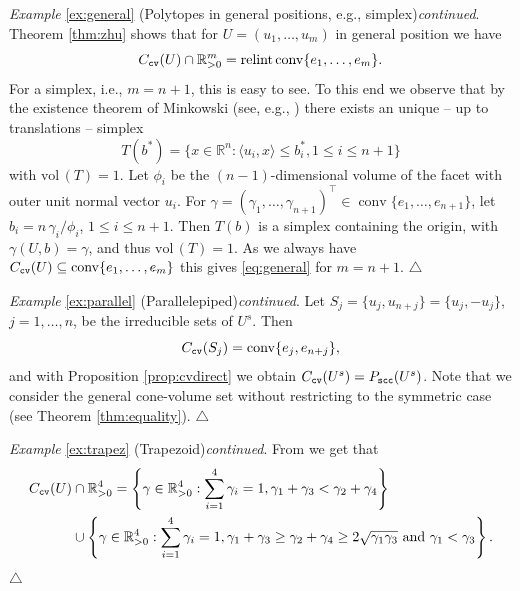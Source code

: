 \documentclass[11pt, a4paper, twoside, reqno]{amsart}
\DeclareMathOperator*{\conv}{conv}
\newcommand{\R}{\mathbb{R}}
\theoremstyle{definition}
\theoremstyle{remark}
\newcommand{\vol}{\mathrm{vol}\,}
\newcommand{\scc}{{\tt scc}}
\newcommand{\cv}{{\tt cv}}
\DeclareMathOperator{\relint}{relint}
\numberwithin{equation}{section}
\begin{document}
\noindent
{\it Example} \ref{ex:general} (Polytopes in general positions, e.g.,
simplex){\it continued}. Theorem
\ref{thm:zhu} shows that for $U=(u_1,\dots,u_m)$ in general position
we have
\begin{equation}
  C_\cv(U)\cap\R^m_{>0}=\relint \conv\{e_1,\dots,e_m\}.
\label{eq:general}
\end{equation}
For a simplex, i.e., $m=n+1$, this is easy to see.
To this end we observe that by the existence theorem of Minkowski
(see, e.g., \cite[Theorem 8.2.1]{Schneider2014})
there exists an unique -- up to
translations -- simplex \begin{equation*}
  T(b^*)=\{ x\in\R^n :
  \langle u_i,  x\rangle\leq b_i^*, 1\leq i\leq n+1\}
\end{equation*} with $\vol(T)=1$.  Let $\phi_i$ be the
$(n-1)$-dimensional volume of the facet with outer unit normal vector
$u_i$. For
  $\gamma=(\gamma_1,\dots,\gamma_{n+1})^\intercal
  \in\conv\{e_1,\dots, e_{n+1}\}$, let $b_i=n\,\gamma_i/\phi_i$,
  $1\leq i\leq n+1$. Then  $T(b)$ is a simplex containing the
origin, with $\gamma(U,b)=\gamma$, and thus $\vol(T)=1$.   As we
always have $C_\cv(U)\subseteq \conv\{e_1,\dots,e_m\}$ this gives
\eqref{eq:general} for $m=n+1$. \hfill $\triangle$


\medskip\noindent
{\it Example} \ref{ex:parallel} (Parallelepiped){\it continued}.
Let $S_j=\{u_j,u_{n+j}\}=\{u_j,-u_j\}$, $j=1,\dots,n$, be the irreducible sets
of $U^s$. Then
\begin{equation*}
         C_\cv(S_j)=\conv\{e_j,e_{n+j}\},
\end{equation*}
and with Proposition \ref{prop:cvdirect} we obtain $C_\cv(U^s)=P_\scc(U^s)$.
Note that we consider the general cone-volume set without restricting
to the symmetric case (see Theorem \ref{thm:equality}). \hfill $\triangle$


\medskip\noindent
{\it Example} \ref{ex:trapez} (Trapezoid){\it continued}.
 From
\cite[Theorem 2.14]{Subspace_Concentration_of_Geometric_Measures} we
get that
\begin{equation}
   \begin{split}
   C_\cv(U)&\cap\R^4_{>0}   = \left\{ \gamma \in \R_{> 0}^4: \sum_{i=1}^4 \gamma_i = 1, \gamma_1 + \gamma_3 < \gamma_2 + \gamma_4 \right\}  \\
        & \cup \left\{ \gamma \in \R_{> 0}^4: \sum_{i=1}^4 \gamma_i =
          1, \gamma_1 + \gamma_3 \geq  \gamma_2 + \gamma_4 \geq 2
          \sqrt{\gamma_1 \gamma_3} \text{ and } \gamma_1 < \gamma_3
          \right\}.
        \end{split}
   \label{eq:trapeziod-hannes}
   \end{equation}
   \medskip
\hfill $\triangle$
\end{document}
